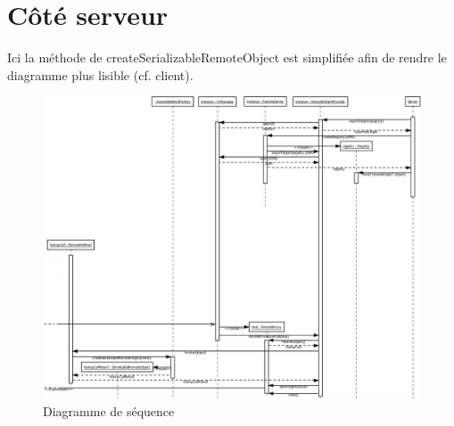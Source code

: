 \section{Côté serveur}
Ici la méthode de createSerializableRemoteObject est simplifiée afin de rendre le diagramme plus lisible (cf. client).
\begin{figure}[H]
\begin{center}
\includegraphics[scale=0.5,angle=90]{img/diag_sequence_server.jpeg}
\caption{Diagramme de séquence}
\end{center}
\end{figure}

